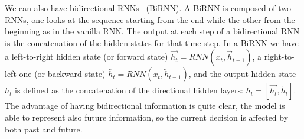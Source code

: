

We can also have bidirectional RNNs~\citep{Schuster1997BiRNN} (BiRNN). A BiRNN is composed of two RNNs, one looks at the sequence starting from the end while the other from the beginning as in the vanilla RNN. The output at each step of a bidirectional RNN is the concatenation of the hidden states for that time step. In a BiRNN we have a left-to-right hidden state (or forward state) $\overrightarrow{h_t} = RNN(x_t, \overrightarrow{h}_{t-1})$, a right-to-left one (or backward state) $\overleftarrow{h_t} = RNN(x_t, \overleftarrow{h}_{t-1})$, and the output hidden state $h_t$ is defined as the concatenation of the directional hidden layers: $h_t = [\overrightarrow{h_t}, \overleftarrow{h_t}]$. The advantage of having bidirectional information is quite clear, the model is able to represent also future information, so the current decision is affected by both past and future.

